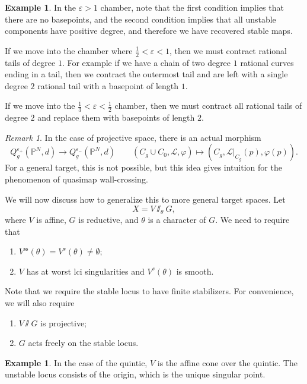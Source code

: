 \documentclass{amsart}
\theoremstyle{definition}
\newtheorem{exm}[thm]{Example}
\theoremstyle{remark}
\newtheorem{rmk}[thm]{Remark}
\theoremstyle{plain}
\theoremstyle{definition}
\theoremstyle{remark}
\renewcommand{\P}{\mathbb{P}}
\newcommand{\ep}{\varepsilon}
\newcommand{\mc}[1]{\mathcal{#1}}
\newcommand{\mr}[1]{\mathrm{#1}}
\newcommand{\1}{\mathbf{1}}
\newcommand{\2}{\mathbf{2}}
\newcommand{\3}{\mathbf{3}}
\begin{document}
\begin{exm}
    In the \(\ep > 1\) chamber, note that the first condition implies that there are no basepoints, and the second condition implies that all unstable components have positive degree, and therefore we have recovered stable maps.

    If we move into the chamber where \(\frac{1}{2} < \ep < 1\), then we must contract rational tails of degree \(1\). For example if we have a chain of two degree \(1\) rational curves ending in a tail, then we contract the outermost tail and are left with a single degree \(2\) rational tail with a basepoint of length \(1\). 

    If we move into the \(\frac{1}{3} < \ep < \frac{1}{2}\) chamber, then we must contract all rational tails of degree \(2\) and replace them with basepoints of length \(2\). 
\end{exm}

\begin{rmk}
    In the case of projective space, there is an actual morphism
    \[ Q_g^{\ep_+}(\P^N, d) \to Q_g^{\ep_-}(\P^N, d) \qquad (C_g \cup C_0, \mc{L}, \varphi) \mapsto (C_g, \mc{L}|_{C_g}(p), \varphi(p)). \]
    For a general target, this is not possible, but this idea gives intuition for the phenomenon of quasimap wall-crossing.
\end{rmk}

We will now discuss how to generalize this to more general target spaces. Let
\[ X = V \sslash_{\theta} G, \]
where \(V\) is affine, \(G\) is reductive, and \(\theta\) is a character of \(G\). We need to require that
\begin{enumerate}
    \item \(V^{\mr{ss}}(\theta) = V^s(\theta) \neq \emptyset\);
    \item \(V\) has at worst lci singularities and \(V^s(\theta)\) is smooth.
\end{enumerate}
Note that we require the stable locus to have finite stabilizers. For convenience, we will also require
\begin{enumerate}
    \item \(V \sslash G\) is projective;
    \item \(G\) acts freely on the stable locus.
\end{enumerate}

\begin{exm}
    In the case of the quintic, \(V\) is the affine cone over the quintic. The unstable locus consists of the origin, which is the unique singular point.
\end{exm}
\end{document}

